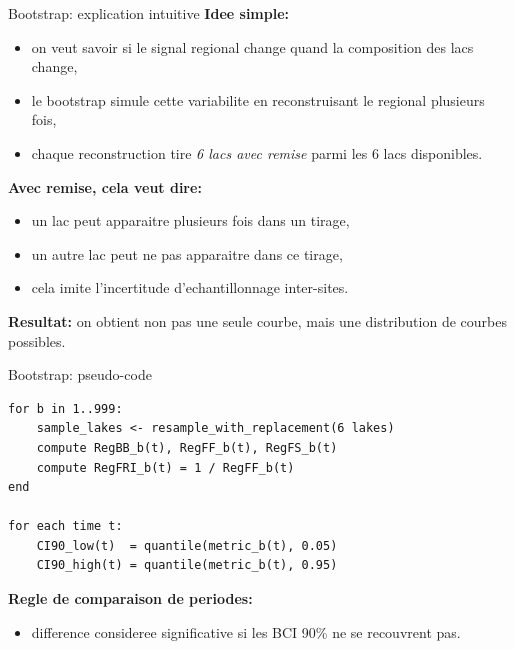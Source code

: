 \documentclass[aspectratio=169,11pt]{beamer}
\begin{document}
\begin{frame}{Bootstrap: explication intuitive}
\textbf{Idee simple:}
\begin{itemize}
  \item on veut savoir si le signal regional change quand la composition des lacs change,
  \item le bootstrap simule cette variabilite en reconstruisant le regional plusieurs fois,
  \item chaque reconstruction tire \textit{6 lacs avec remise} parmi les 6 lacs disponibles.
\end{itemize}

\textbf{Avec remise, cela veut dire:}
\begin{itemize}
  \item un lac peut apparaitre plusieurs fois dans un tirage,
  \item un autre lac peut ne pas apparaitre dans ce tirage,
  \item cela imite l'incertitude d'echantillonnage inter-sites.
\end{itemize}

\textbf{Resultat:} on obtient non pas une seule courbe, mais une distribution de courbes possibles.
\end{frame}

\begin{frame}[fragile]{Bootstrap: pseudo-code}
\footnotesize
\begin{verbatim}
for b in 1..999:
    sample_lakes <- resample_with_replacement(6 lakes)
    compute RegBB_b(t), RegFF_b(t), RegFS_b(t)
    compute RegFRI_b(t) = 1 / RegFF_b(t)
end

for each time t:
    CI90_low(t)  = quantile(metric_b(t), 0.05)
    CI90_high(t) = quantile(metric_b(t), 0.95)
\end{verbatim}

\normalsize
\textbf{Regle de comparaison de periodes:}
\begin{itemize}
  \item difference consideree significative si les BCI 90\% ne se recouvrent pas.
\end{itemize}
\end{frame}
\end{document}
